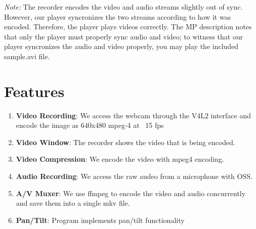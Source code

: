 \documentclass[a4paper]{article}
\begin{document}
\textit{Note:} The recorder encodes the video and audio streams slightly out of sync. However,
our player syncronizes the two streams according to how it was encoded. Therefore,
the player plays videos correctly. The MP description notes that only the player 
must properly sync audio and video; to witness that our player syncronizes the audio
and video properly, you may play the included sample.avi file.

\section{Features}
	\begin{enumerate}
	\item \textbf{Video Recording}: We access the webcam through the V4L2 interface and encode the image as 640x480 mpeg-4 at ~15 fps
	\item \textbf{Video Window}: The recorder shows the video that is being encoded.
	\item \textbf{Video Compression}:  We encode the video with mpeg4 encoding.
	\item \textbf{Audio Recording}: We access the raw audeo from a microphone with OSS.
	\item \textbf{A/V Muxer}:  We use ffmpeg to encode the video and audio concurrently and save them into a single mkv file.
	\item \textbf{Pan/Tilt}: Program implements pan/tilt functionality
	\end{enumerate}
\end{document}
